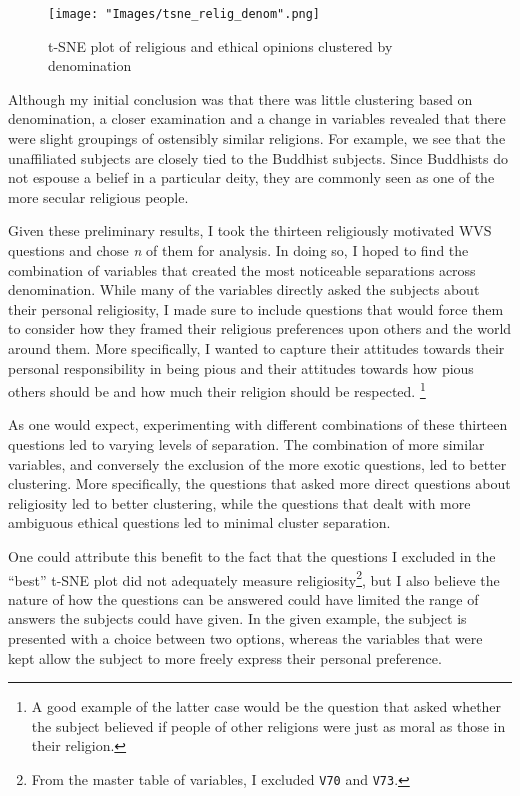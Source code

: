 \documentclass{article}
\begin{document}
	\begin{figure}[h]
		\centering
		\texttt{[image: "Images/tsne\_relig\_denom".png]}
		\caption{t-SNE plot of religious and ethical opinions clustered by denomination}
	\end{figure}

 	Although my initial conclusion was that there was little clustering based on denomination, a closer examination and a change in variables revealed that there were slight groupings of ostensibly similar religions. For example, we see that the unaffiliated subjects are closely tied to the Buddhist subjects. Since Buddhists do not espouse a belief in a particular deity, they are commonly seen as one of the more secular religious people.

	Given these preliminary results, I took the thirteen religiously motivated WVS questions and chose \textit{n} of them for analysis. In doing so, I hoped to find the combination of variables that created the most noticeable separations across denomination. While many of the variables directly asked the subjects about their personal religiosity, I made sure to include questions that would force them to consider how they framed their religious preferences upon others and the world around them. More specifically, I wanted to capture their attitudes towards their personal responsibility in being pious and their attitudes towards how pious others should be and how much their religion should be respected. \footnote{A good example of the latter case would be the question that asked whether the subject believed if people of other religions were just as moral as those in their religion.}
	
	As one would expect, experimenting with different combinations of these thirteen questions led to varying levels of separation. The combination of more similar variables, and conversely the exclusion of the more exotic questions, led to better clustering. More specifically, the questions that asked more direct questions about religiosity led to better clustering, while the questions that dealt with more ambiguous ethical questions led to minimal cluster separation.
	
	One could attribute this benefit to the fact that the questions I excluded in the ``best'' t-SNE plot did not adequately measure religiosity\footnote{From the master table of variables, I excluded \texttt{V70} and \texttt{V73}.}, but I also believe the nature of how the questions can be answered could have limited the range of answers the subjects could have given. In the given example, the subject is presented with a choice between two options, whereas the variables that were kept allow the subject to more freely express their personal preference.
\end{document}
